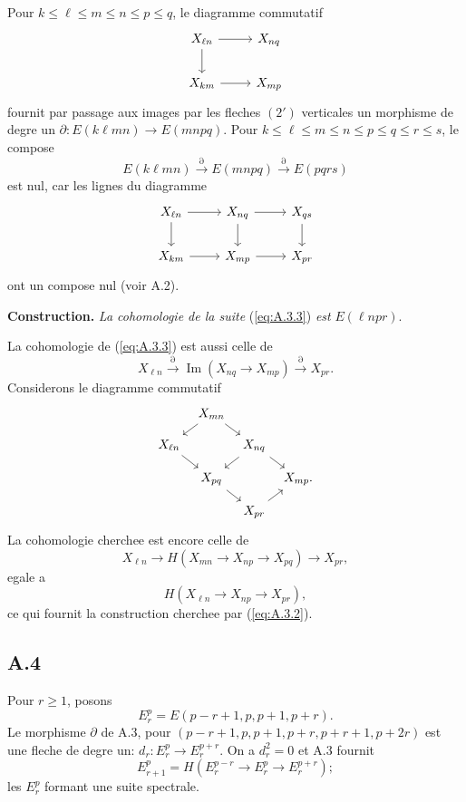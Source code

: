 \documentclass[11pt,a4paper]{article}
\theoremstyle{plain}
\theoremstyle{definition}
\begin{document}
Pour $k \leqslant \ell \leqslant m \leqslant n \leqslant p \leqslant q$, le diagramme commutatif
\[
\begin{tikzcd}
X_{\ell n} \arrow[r] \arrow[d] & X_{nq} \\
X_{km} \arrow[r] & X_{mp}
\end{tikzcd}
\]
fournit par passage aux images par les fleches $(2')$ verticales un morphisme de degre un $\partial \colon E(k\ell mn) \to E(mnpq)$. Pour $k \leqslant \ell \leqslant m \leqslant n \leqslant p \leqslant q \leqslant r \leqslant s$, le compose
\begin{equation}\label{eq:A.3.3}
E(k\ell mn) \xrightarrow{\partial} E(mnpq) \xrightarrow{\partial} E(pqrs)
\end{equation}
est nul, car les lignes du diagramme
\[
\begin{tikzcd}
X_{\ell n} \arrow[r] \arrow[d] & X_{nq} \arrow[r] \arrow[d] & X_{qs} \arrow[d] \\
X_{km} \arrow[r] & X_{mp} \arrow[r] & X_{pr}
\end{tikzcd}
\]
ont un compose nul (voir A.2).

\textbf{Construction.} \emph{La cohomologie de la suite} (\ref{eq:A.3.3}) \emph{est} $E(\ell npr)$.

La cohomologie de (\ref{eq:A.3.3}) est aussi celle de
\[
X_{\ell n} \xrightarrow{\partial} \operatorname{Im}(X_{nq} \to X_{mp}) \xrightarrow{\partial} X_{pr}.
\]
Considerons le diagramme commutatif
\[
\begin{tikzcd}[column sep=tiny,row sep=small]
& X_{mn} \arrow[rd] \arrow[ld] \\
X_{\ell n} \arrow[rd] & & X_{nq} \arrow[ld] \arrow[rd] \\
& X_{pq} \arrow[rd] & & X_{mp}. \\
& & X_{pr} \arrow[ru]
\end{tikzcd}
\]
La cohomologie cherchee est encore celle de
\[
X_{\ell n} \to H(X_{mn} \to X_{np} \to X_{pq}) \to X_{pr},
\]
egale a
\[
H(X_{\ell n} \to X_{np} \to X_{pr}),
\]
ce qui fournit la construction cherchee par (\ref{eq:A.3.2}).

\subsection*{A.4}
Pour $r \geqslant 1$, posons
\[
E_r^p = E(p-r+1, p, p+1, p+r).
\]
Le morphisme $\partial$ de A.3, pour $(p-r+1, p, p+1, p+r, p+r+1, p+2r)$ est une fleche de degre un: $d_r \colon E_r^p \to E_r^{p+r}$. On a $d_r^2 = 0$ et A.3 fournit
\[
E_{r+1}^p = H(E_r^{p-r} \to E_r^p \to E_r^{p+r});
\]
les $E_r^p$ formant une suite spectrale.
\end{document}
